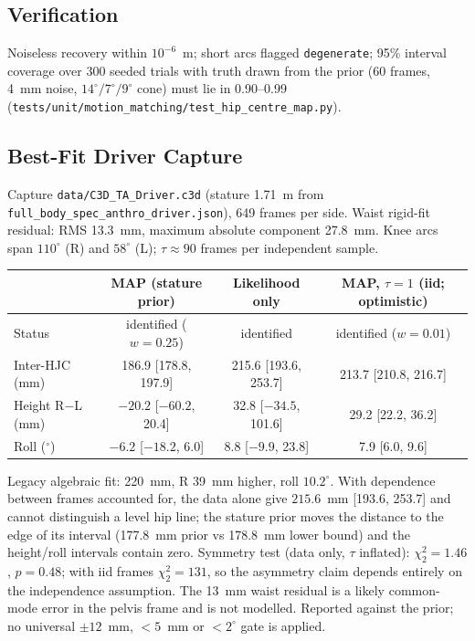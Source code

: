 \subsection{Verification}
Noiseless recovery within $10^{-6}$~m; short arcs flagged \texttt{degenerate}; 95\%
interval coverage over 300 seeded trials with truth drawn from the prior (60 frames,
4~mm noise, $14^\circ/7^\circ/9^\circ$ cone) must lie in 0.90--0.99
(\texttt{tests/unit/motion\_matching/test\_hip\_centre\_map.py}).

\subsection{Best-Fit Driver Capture}
Capture \texttt{data/C3D\_TA\_Driver.c3d} (stature 1.71~m from
\texttt{full\_body\_spec\_anthro\_driver.json}), 649 frames per side. Waist rigid-fit residual:
RMS 13.3~mm, maximum absolute component 27.8~mm. Knee arcs span $110^\circ$ (R) and $58^\circ$ (L);
$\tau\approx90$ frames per independent sample.

\begin{center}
\begin{tabular}{lccc}
\hline
 & MAP (stature prior) & Likelihood only & MAP, $\tau=1$ (iid; optimistic) \\
\hline
Status & identified ($w=0.25$) & identified & identified ($w=0.01$) \\
Inter-HJC (mm) & 186.9 [178.8, 197.9] & 215.6 [193.6, 253.7] & 213.7 [210.8, 216.7] \\
Height R$-$L (mm) & $-20.2$ [$-60.2$, 20.4] & 32.8 [$-34.5$, 101.6] & 29.2 [22.2, 36.2] \\
Roll ($^\circ$) & $-6.2$ [$-18.2$, 6.0] & 8.8 [$-9.9$, 23.8] & 7.9 [6.0, 9.6] \\
\hline
\end{tabular}
\end{center}
Legacy algebraic fit: 220~mm, R 39~mm higher, roll $10.2^\circ$. With dependence between
frames accounted for, the data alone give $215.6$~mm [193.6, 253.7] and cannot distinguish
a level hip line; the stature prior moves the distance to the edge of its
interval (177.8~mm prior vs 178.8~mm lower bound) and the height/roll intervals contain zero.
Symmetry test (data only, $\tau$ inflated): $\chi^2_2=1.46$, $p=0.48$; with iid frames
$\chi^2_2=131$, so the asymmetry claim depends entirely on the independence assumption.
The 13~mm waist residual is a likely common-mode error in the pelvis frame and is not
modelled. Reported against the prior; no universal $\pm12$~mm, $<5$~mm or $<2^\circ$ gate is applied.

